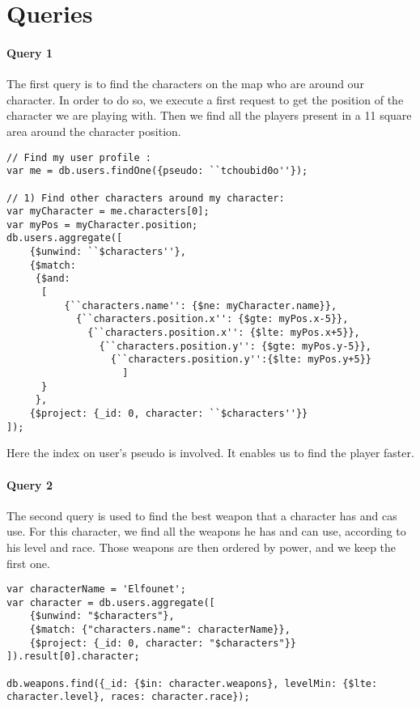 \documentclass[a4paper, 11pt]{article}
\begin{document}
\section{Queries}
\paragraph*{Query 1\\}
The first query is to find the characters on the map who are around our character. In order to do so, we execute a first request to get the position of the character we are playing with. Then we find all the players present in a 11 square area around the character position.

\begin{lstlisting}
// Find my user profile : 
var me = db.users.findOne({pseudo: ``tchoubid0o''});

// 1) Find other characters around my character:
var myCharacter = me.characters[0];
var myPos = myCharacter.position;
db.users.aggregate([
    {$unwind: ``$characters''}, 
    {$match: 
     {$and: 
      [
          {``characters.name'': {$ne: myCharacter.name}},
            {``characters.position.x'': {$gte: myPos.x-5}}, 
              {``characters.position.x'': {$lte: myPos.x+5}}, 
                {``characters.position.y'': {$gte: myPos.y-5}}, 
                  {``characters.position.y'':{$lte: myPos.y+5}}
                    ]
      }
     },
    {$project: {_id: 0, character: ``$characters''}}
]);
\end{lstlisting}

Here the index on user's pseudo is involved. It enables us to find the player faster.

\paragraph*{Query 2\\}
The second query is used to find the best weapon that a character has and cas use. For this character, we find all the weapons he has and can use, according to his level and race. Those weapons are then ordered by power, and we keep the first one.

\begin{lstlisting}
var characterName = 'Elfounet';
var character = db.users.aggregate([
    {$unwind: "$characters"}, 
    {$match: {"characters.name": characterName}},
    {$project: {_id: 0, character: "$characters"}}
]).result[0].character;

db.weapons.find({_id: {$in: character.weapons}, levelMin: {$lte: character.level}, races: character.race});
\end{lstlisting}
\end{document}
